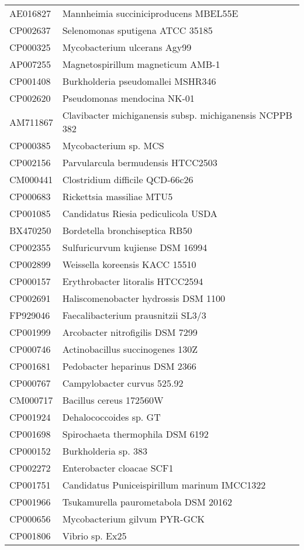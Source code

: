 \begin{longtable}{ll}
AE016827 & Mannheimia succiniciproducens MBEL55E\\
CP002637 & Selenomonas sputigena ATCC 35185\\
CP000325 & Mycobacterium ulcerans Agy99\\
AP007255 & Magnetospirillum magneticum AMB-1\\
CP001408 & Burkholderia pseudomallei MSHR346\\
CP002620 & Pseudomonas mendocina NK-01\\
AM711867 & Clavibacter michiganensis subsp. michiganensis NCPPB 382\\
CP000385 & Mycobacterium sp. MCS\\
CP002156 & Parvularcula bermudensis HTCC2503\\
CM000441 & Clostridium difficile QCD-66c26\\
CP000683 & Rickettsia massiliae MTU5\\
CP001085 & Candidatus Riesia pediculicola USDA\\
BX470250 & Bordetella bronchiseptica RB50\\
CP002355 & Sulfuricurvum kujiense DSM 16994\\
CP002899 & Weissella koreensis KACC 15510\\
CP000157 & Erythrobacter litoralis HTCC2594\\
CP002691 & Haliscomenobacter hydrossis DSM 1100\\
FP929046 & Faecalibacterium prausnitzii SL3/3\\
CP001999 & Arcobacter nitrofigilis DSM 7299\\
CP000746 & Actinobacillus succinogenes 130Z\\
CP001681 & Pedobacter heparinus DSM 2366\\
CP000767 & Campylobacter curvus 525.92\\
CM000717 & Bacillus cereus 172560W\\
CP001924 & Dehalococcoides sp. GT\\
CP001698 & Spirochaeta thermophila DSM 6192\\
CP000152 & Burkholderia sp. 383\\
CP002272 & Enterobacter cloacae SCF1\\
CP001751 & Candidatus Puniceispirillum marinum IMCC1322\\
CP001966 & Tsukamurella paurometabola DSM 20162\\
CP000656 & Mycobacterium gilvum PYR-GCK\\
CP001806 & Vibrio sp. Ex25\\

\end{longtable}
